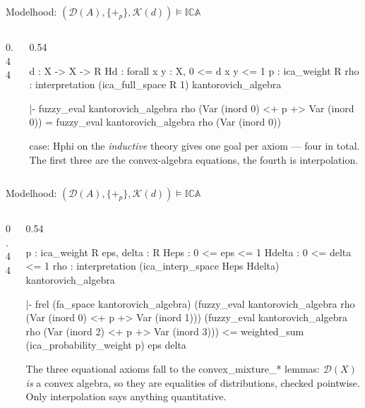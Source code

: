 \documentclass[10pt,aspectratio=169]{beamer}
\newcommand{\ICA}{\mathbb{I}\mathbb{C}\mathbb{A}}
\newcommand{\Dist}{\mathcal{D}}
\newcommand{\Kan}{\mathcal{K}}
\newcommand{\bpl}[1]{+_{#1}}
\newcommand{\rid}[1]{{\ttfamily\small #1}}
\begin{document}
\begin{frame}[fragile]{Modelhood: $(\Dist(A),\{\bpl{p}\},\Kan(d)) \models \ICA$}
  \begin{columns}[T]
  \begin{column}{0.44\textwidth}\end{column}
  \begin{column}{0.54\textwidth}
    \begin{goalbox}[title={Goal 1 / 4 \quad (ICA\_Idem)}]
\begin{gctx}
d : X -> X -> R
Hd : forall x y : X, 0 <= d x y <= 1
p : ica_weight R
rho : interpretation (ica_full_space R 1)
        kantorovich_algebra
\end{gctx}
\tcblower
\begin{gconc}
|- fuzzy_eval kantorovich_algebra rho
     (Var (inord 0) <+ p +> Var (inord 0)) =
   fuzzy_eval kantorovich_algebra rho (Var (inord 0))
\end{gconc}
    \end{goalbox}
    \smallskip
    {\footnotesize \rid{case: Hphi} on the \emph{inductive} theory gives
    one goal per axiom --- four in total. The first three are the
    convex-algebra equations, the fourth is interpolation.}
  \end{column}
  \end{columns}
\end{frame}

\begin{frame}[fragile]{Modelhood: $(\Dist(A),\{\bpl{p}\},\Kan(d)) \models \ICA$}
  \begin{columns}[T]
  \begin{column}{0.44\textwidth}\end{column}
  \begin{column}{0.54\textwidth}
    \begin{goalbox}[title={Goal 4 / 4 \quad (ICA\_Interp)}]
\begin{gctx}
p : ica_weight R
eps, delta : R
Heps : 0 <= eps <= 1
Hdelta : 0 <= delta <= 1
rho : interpretation (ica_interp_space Heps Hdelta)
        kantorovich_algebra
\end{gctx}
\tcblower
\begin{gconc}
|- frel (fa_space kantorovich_algebra)
     (fuzzy_eval kantorovich_algebra rho
        (Var (inord 0) <+ p +> Var (inord 1)))
     (fuzzy_eval kantorovich_algebra rho
        (Var (inord 2) <+ p +> Var (inord 3)))
   <= weighted_sum (ica_probability_weight p) eps delta
\end{gconc}
    \end{goalbox}
    \smallskip
    {\footnotesize The three equational axioms fall to the
    \rid{convex\_mixture\_*} lemmas: $\Dist(X)$ \emph{is} a convex
    algebra, so they are equalities of distributions, checked
    pointwise. Only interpolation says anything quantitative.}
  \end{column}
  \end{columns}
\end{frame}
\end{document}
